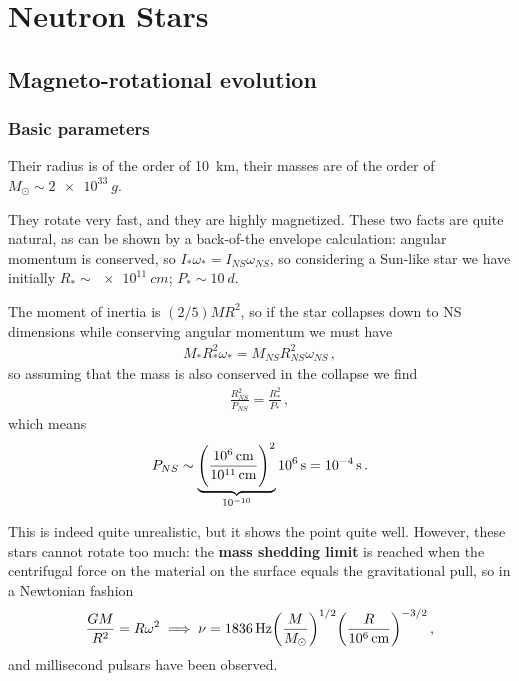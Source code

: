 \documentclass[main.tex]{subfiles}
\begin{document}
\chapter{Neutron Stars}

\section{Magneto-rotational evolution}

\subsection{Basic parameters}


Their radius is of the order of \SI{10}{km}, their masses are of the order of \(M_{\odot} \sim \SI{2e33}{g}\). 

They rotate very fast, and they are highly magnetized. 
These two facts are quite natural, as can be shown by a back-of-the envelope calculation: angular momentum is conserved, so \(I_* \omega _* = I_{NS } \omega _{NS}\), so considering a Sun-like star we have initially \(R_* \sim \SI{e11}{cm}\); \(P_* \sim \SI{10}{d}\). 

The moment of inertia is \((2/5) M R^2\), so if the star collapses down to NS dimensions while conserving angular momentum we must have
%
\begin{align}
M_* R_*^2 \omega _* = M_{NS} R_{NS}^2 \omega _{NS}
\,,
\end{align}
%
so assuming that the mass is also conserved in the collapse we find 
%
\begin{align}
\frac{R_{NS}^2}{P_{NS}} =
\frac{R_{*}^2}{P_*}
\,,
\end{align}
%
which means 
%
\begin{align}
P_{NS} \sim \underbrace{\qty(\frac{\SI{e6}{cm}}{\SI{e11}{cm}})^2}_{\num{e-10}} \SI{e6}{s} = \SI{e-4}{s}
\,.
\end{align}

This is indeed quite unrealistic, but it shows the point quite well. 
However, these stars cannot rotate too much: the \textbf{mass shedding limit} is reached when the centrifugal force on the material on the surface equals the gravitational pull, so in a Newtonian fashion
%
\begin{align}
\frac{GM}{R^2} = R \omega^2 \implies \nu = \SI{1836}{Hz}  \qty(\frac{M}{M_{\odot}})^{1/2}  \qty( \frac{R}{\SI{e6}{cm}})^{-3/2}  
\,,
\end{align}
%
and millisecond pulsars have been observed.
\end{document}

